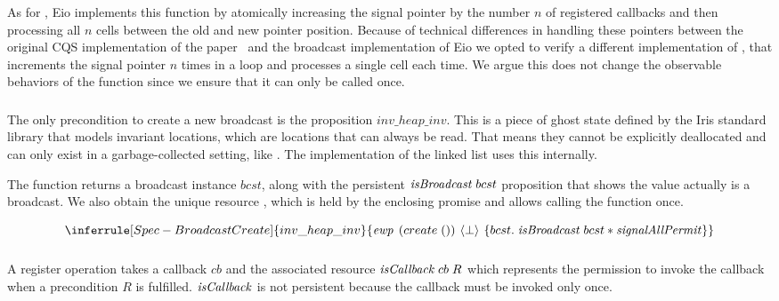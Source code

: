 As for , Eio implements this function by atomically increasing the signal pointer by the number \(n\) of registered callbacks and then processing all \(n\) cells between the old and new pointer position.
Because of technical differences in handling these pointers between the original CQS implementation of the paper~\cite{koval2023cqs} and the broadcast implementation of Eio we opted to verify a different implementation of , that increments the signal pointer \(n\) times in a loop and processes a single cell each time.
We argue this does not change the observable behaviors of the function since we ensure that it can only be called once.

\subsubsection{}
\label{sec:broadcast-spec-create}

The only precondition to create a new broadcast is the proposition \(inv\_heap\_inv\).
This is a piece of ghost state defined by the Iris standard library that models invariant locations, which are locations that can always be read.
That means they cannot be explicitly deallocated and can only exist in a garbage-collected setting, like \ocf{}.
The implementation of the linked list uses this internally.

The function returns a broadcast instance \(bcst\), along with the persistent \(\mathit{isBroadcast}{}\; bcst\) proposition that shows the value actually is a broadcast.
We also obtain the unique resource \gssignal{}, which is held by the enclosing promise and allows calling the  function once.

\[
  \inferrule[Spec-BroadcastCreate]
  {inv\_heap\_inv}
  {\ewp{create\; ()}{\bot}{bcst.\; \gsIsBcst{}\; bcst \ast \gssignal{}}}
\]

\subsubsection{}
\label{sec:broadcast-spec-suspend}

A register operation takes a callback \(cb\) and the associated resource \(\mathit{isCallback}{}\; cb\; R\) which represents the permission to invoke the callback when a precondition \(R\) is fulfilled.
\(\mathit{isCallback}{}\) is not persistent because the callback must be invoked only once.

